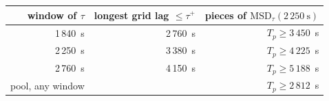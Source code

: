 \begin{tabular}{rrr}
\toprule
window of $\tau$ & longest grid lag $\le\tau^+$ & pieces of $\mathrm{MSD}_\tau(2\,250~\mathrm{s})$ \\
\midrule
1\,840~s & 2\,760~s & $T_p\ge3\,450$~s \\
2\,250~s & 3\,380~s & $T_p\ge4\,225$~s \\
2\,760~s & 4\,150~s & $T_p\ge5\,188$~s \\
\midrule
pool, any window & & $T_p\ge2\,812$~s \\
\bottomrule
\end{tabular}
